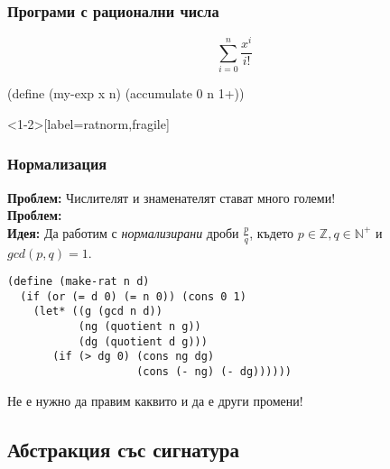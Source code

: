 \documentclass[alsotrans]{beamerswitch}
\begin{document}
\begin{frame}[label=ratprog,fragile]
  \frametitle{Програми с рационални числа}

  \begin{equation*}
    \sum_{i=0}^n \frac{x^i}{i!}
  \end{equation*}

  \onslide<+->

  \begin{overprint}
\begin{semiverbatim}
(define (my-exp x n)
  (accumulate
      0 n
     1+))
\end{semiverbatim}
  \end{overprint}
\end{frame}

\begin{frame}<1-2>[label=ratnorm,fragile]
  \frametitle{Нормализация}

  \textbf{Проблем:} Числителят и знаменателят стават много големи!\\[2ex]
  \pause
  \textbf{Проблем:} \\[2ex]
  \pause
  \textbf{Идея:} Да работим с \emph{нормализирани} дроби $\frac p q$, където $p \in \mathbb Z, q \in \mathbb N^+$ и $gcd(p,q) = 1$.
  \pause
\begin{lstlisting}
(define (make-rat n d)
  (if (or (= d 0) (= n 0)) (cons 0 1)
    (let* ((g (gcd n d))
           (ng (quotient n g))
           (dg (quotient d g)))
       (if (> dg 0) (cons ng dg)
                    (cons (- ng) (- dg))))))
\end{lstlisting}
  \pause
  \alert{Не е нужно да правим каквито и да е други промени!}
\end{frame}



\subsection{Абстракция със сигнатура}
\end{document}
